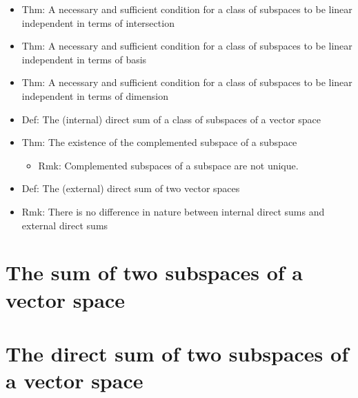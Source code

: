 \documentclass[onecolumn]{ctexart}
\begin{document}
\begin{itemize}
\begin{itemize}
\begin{itemize}
    \end{itemize}
    \item Thm: A necessary and sufficient condition for a class of subspaces to be linear independent in terms of intersection
    \item Thm: A necessary and sufficient condition for a class of subspaces to be linear independent in terms of basis
    \item Thm: A necessary and sufficient condition for a class of subspaces to be linear independent in terms of dimension
    \item Def: The (internal) direct sum of a class of subspaces of a vector space
    \item Thm: The existence of the complemented subspace of a subspace
    \begin{itemize}
      \item Rmk: Complemented subspaces of a subspace are not unique.
    \end{itemize}
    \item Def: The (external) direct sum of two vector spaces
    \item Rmk: There is no difference in nature between internal direct sums and external direct sums
  \end{itemize}
\end{itemize}

\section{The sum of two subspaces of a vector space}

\section{The direct sum of two subspaces of a vector space}
\end{document}
